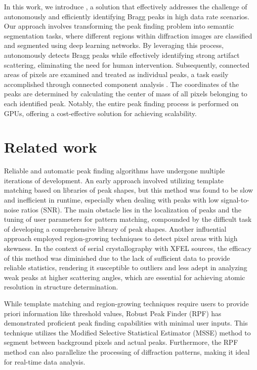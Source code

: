\documentclass[a4paper]{article}
\begin{document}
In this work, we introduce \peaknet{}, a solution that effectively addresses the challenge of autonomously and efficiently identifying Bragg peaks in high data rate scenarios.  Our approach involves transforming the peak finding problem into semantic segmentation tasks, where different regions within diffraction images are classified and segmented using deep learning networks.  By leveraging this process, \peaknet{} autonomously detects Bragg peaks while effectively identifying strong artifact scattering, eliminating the need for human intervention.  Subsequently, connected areas of pixels are examined and treated as individual peaks, a task easily accomplished through connected component analysis \citep{weaverCentrosymmetricCrossSymmetricMatrices1985}.  The coordinates of the peaks are determined by calculating the center of mass of all pixels belonging to each identified peak.  Notably, the entire peak finding process is performed on GPUs, offering a cost-effective solution for achieving scalability.


\section{Related work}

Reliable and automatic peak finding algorithms have undergone multiple iterations of development.  An early approach involved utilizing template matching \citep{wilkinsonIntegrationSinglecrystalReflections1988a} based on libraries of peak shapes, but this method was found to be slow and inefficient in runtime, especially when dealing with peaks with low signal-to-noise ratios (SNR).  The main obstacle lies in the localization of peaks and the tuning of user parameters for pattern matching, compounded by the difficult task of developing a comprehensive library of peak shapes.  Another influential approach employed region-growing techniques \citep{bolotovskySeedSkewnessMethodIntegration1995, bartyCheetahSoftwareHighthroughput2014} to detect pixel areas with high skewness.  In the context of serial crystallography with XFEL sources, the efficacy of this method was diminished due to the lack of sufficient data to provide reliable statistics, rendering it susceptible to outliers and less adept in analyzing weak peaks at higher scattering angles, which are essential for achieving atomic resolution in structure determination.

While template matching and region-growing techniques require users to provide priori information like threshold values, Robust Peak Finder (RPF) \citep{hadian-jaziPeakfindingAlgorithmBased2017, hadian-jaziDataReductionSerial2021} has demonstrated proficient peak finding capabilities with minimal user inputs.  This technique utilizes the Modified Selective Statistical Estimator (MSSE) method to segment between background pixels and actual peaks.  Furthermore, the RPF method can also parallelize the processing of diffraction patterns, making it ideal for real-time data analysis.
\end{document}
